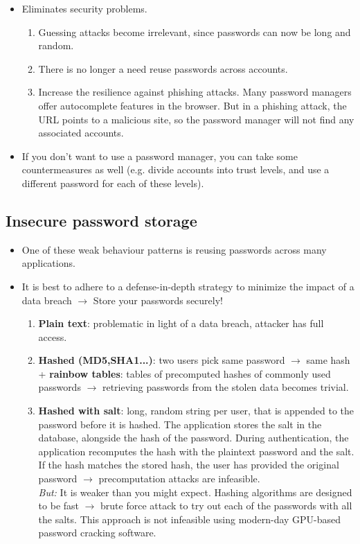\documentclass[../main.tex]{subfiles}
\begin{document}
\begin{itemize}
\item Eliminates security problems.
\begin{enumerate}
\item Guessing attacks become irrelevant, since passwords can now be long and random.
\item There is no longer a need reuse passwords across accounts.
\item Increase the resilience against phishing attacks. Many password managers offer autocomplete features in the browser. But in a phishing attack, the URL points to a malicious site, so the password manager will not find any associated accounts.
\end{enumerate}
\item If you don't want to use a password manager, you can take some countermeasures as well (e.g. divide accounts into trust levels, and use a different password for each of these levels).
\end{itemize}

\subsection{Insecure password storage}
\begin{itemize}
\item One of these weak behaviour patterns is reusing passwords across many applications.
\item It is best to adhere to a defense-in-depth strategy to minimize the impact of a data breach $\rightarrow$ Store your passwords securely!
\begin{enumerate}
\item \textbf{Plain text}: problematic in light of a data breach, attacker has full access. 
\item \textbf{Hashed (MD5,SHA1...)}: two users pick same password $\rightarrow$ same hash + \textbf{rainbow tables}: tables of precomputed hashes of commonly used passwords $\rightarrow$ retrieving passwords from the stolen data becomes trivial.
\item \textbf{Hashed with salt}: long, random string per user, that is appended to the password before it is hashed. The application stores the salt in the database, alongside the hash of the password. During authentication, the application recomputes the hash with the plaintext password and the salt. If the hash matches the stored hash, the user has provided the original password $\rightarrow$ precomputation attacks are infeasible.\\
\emph{But:} It is weaker than you might expect. Hashing algorithms are designed to be fast $\rightarrow$ brute force attack to try out each of the passwords with all the salts. This approach is not infeasible using modern-day GPU-based password cracking software.
\end{enumerate}
\end{itemize}
\end{document}
